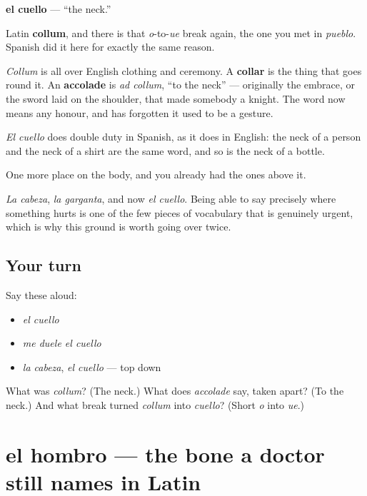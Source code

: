 \begin{cousinweb}
\textbf{el cuello} — \textquotedblleft{}the neck.\textquotedblright{}

Latin \textbf{collum}, and there is that \emph{o}-to-\emph{ue} break again, the one you met in \emph{pueblo}. Spanish did it here for exactly the same reason.

\emph{Collum} is all over English clothing and ceremony. A \textbf{collar} is the thing that goes round it. An \textbf{accolade} is \emph{ad collum}, \textquotedblleft{}to the neck\textquotedblright{} — originally the embrace, or the sword laid on the shoulder, that made somebody a knight. The word now means any honour, and has forgotten it used to be a gesture.

\emph{El cuello} does double duty in Spanish, as it does in English: the neck of a person and the neck of a shirt are the same word, and so is the neck of a bottle.
\end{cousinweb}

\begin{grammarlens}[title={What you've built}]
One more place on the body, and you already had the ones above it.

\emph{La cabeza}, \emph{la garganta}, and now \emph{el cuello}. Being able to say precisely where something hurts is one of the few pieces of vocabulary that is genuinely urgent, which is why this ground is worth going over twice.
\end{grammarlens}

\subsection*{Your turn}
Say these aloud:

\begin{itemize}
\raggedright
  \item \emph{el cuello}
  \item \emph{me duele el cuello}
  \item \emph{la cabeza}, \emph{el cuello} — top down
\end{itemize}

\begin{tcolorbox}[breakable,colback=teal!4,colframe=teal!35!black,title={Before you move on}]
What was \emph{collum}? (The neck.) What does \emph{accolade} say, taken apart? (To the neck.) And what break turned \emph{collum} into \emph{cuello}? (Short \emph{o} into \emph{ue}.)
\end{tcolorbox}
\section[el hombro]{el hombro — the bone a doctor still names in Latin}

